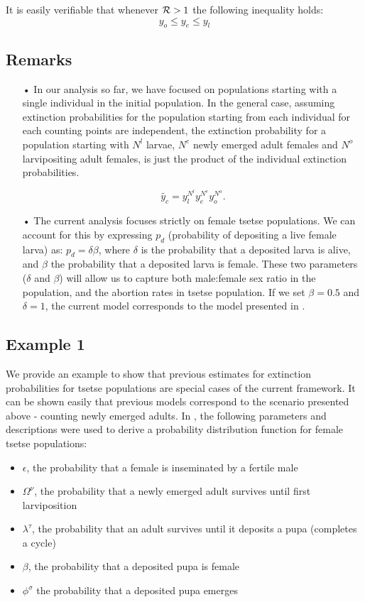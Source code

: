 \documentclass[smallextended]{svjour3}
\begin{document}
It is easily verifiable that whenever ${\cal R}>1$ the following inequality holds:
\begin{equation}
	\label{Aretsetsetheorem}
	y_{o}\leq y_{e} \leq y_{l}
\end{equation} 


\subsection*{\bf Remarks}
\begin{itemize}
	\item[•] In our analysis so far, we have focused on populations starting with a single individual in the initial population. In the general case, assuming extinction probabilities for the population starting from each individual for each counting points are independent, the extinction probability for a population starting with $N^l$ larvae, $N^e$ newly emerged adult females and $N^o$ larvipositing adult females, is just the product of the individual extinction probabilities.
	
	$$\tilde{y_c}=y_l^{N^l} y_e^{N^e} y_o^{N^o}.$$

	\item[•] The current analysis focuses strictly on female tsetse populations. We can account for this  by expressing  $p_d$ (probability of depositing a live female larva) as:  $p_d =\delta \beta$, where $\delta$ is the probability that a deposited larva is alive, and $\beta$ the probability that a deposited larva is female.  These two parameters ($\delta$ and $\beta$) will allow us to capture both male:female sex ratio in the population, and  the abortion rates in tsetse population.  If we set $\beta = 0.5$ and $\delta = 1$, the current model corresponds to the model presented in \cite{Hargrove2005a}. 
\end{itemize}

\subsection{Example 1}

We provide an example to show that previous estimates for extinction probabilities for tsetse populations are special cases of the current framework. It can be shown easily that previous models \cite{Hargrove2005a,Kajunguri2019,Are2019} correspond to the scenario presented above - counting newly emerged adults. In \cite{Are2019}, the following parameters and descriptions were used to derive a probability distribution function for female tsetse populations: 
\begin{itemize}
	\item $\epsilon$, the probability that a female is inseminated by a fertile male 
	\item $\Omega^{\nu}$,  the probability that a newly emerged adult survives until first larviposition
	\item $ \lambda^{\tau}$, the probability that an adult survives until it deposits a pupa (completes a cycle)
	\item $\beta$,  the probability that a deposited pupa is female 
	\item $\phi^{\sigma}$  the probability that a deposited pupa emerges
\end{itemize}
\end{document}
